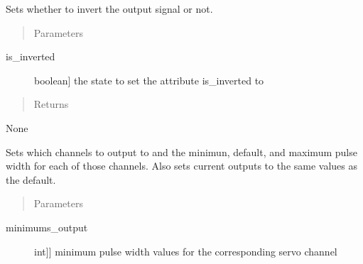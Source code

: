 \documentclass[letterpaper,10pt,english]{sphinxmanual}
\begin{document}
\begin{fulllineitems}
\begin{fulllineitems}
\end{fulllineitems}


\begin{fulllineitems}
\label{\detokenize{generic:AnalogOutputObject.AnalogOutputObject.set_inversion}}
\sphinxAtStartPar
Sets whether to invert the output signal or not.
\begin{quote}\begin{description}
\item[{Parameters}] \leavevmode
\end{description}\end{quote}
\begin{description}
\item[{is\_inverted}] \leavevmode{[}boolean{]}
\sphinxAtStartPar
the state to set the attribute is\_inverted to

\end{description}
\begin{quote}\begin{description}
\item[{Returns}] \leavevmode
\end{description}\end{quote}

\sphinxAtStartPar
None

\end{fulllineitems}


\begin{fulllineitems}
\label{\detokenize{generic:AnalogOutputObject.AnalogOutputObject.set_outputs}}
\sphinxAtStartPar
Sets which channels to output to and the minimun, default, and maximum pulse width for each of those channels.
Also sets current outputs to the same values as the default.
\begin{quote}\begin{description}
\item[{Parameters}] \leavevmode
\end{description}\end{quote}
\begin{description}
\item[{minimums\_output}] \leavevmode{[}{[}int{]}{]}
\sphinxAtStartPar
minimum pulse width values for the corresponding servo channel


\end{description}
\end{fulllineitems}
\end{fulllineitems}
\end{document}
